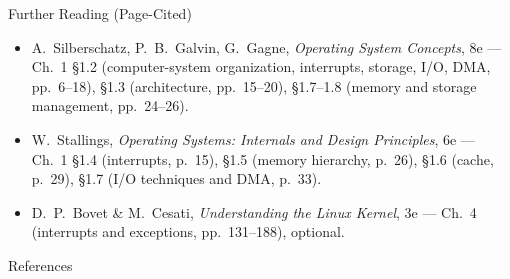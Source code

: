 \documentclass[aspectratio=169]{beamer}
\begin{document}
\begin{frame}{Further Reading (Page-Cited)}
  \footnotesize
  \begin{itemize}
    \item A.~Silberschatz, P.~B.~Galvin, G.~Gagne, \emph{Operating System
      Concepts}, 8e --- Ch.~1 \S1.2 (computer-system organization, interrupts,
      storage, I/O, DMA, pp.~6--18), \S1.3 (architecture, pp.~15--20),
      \S1.7--1.8 (memory and storage management, pp.~24--26).
    \item W.~Stallings, \emph{Operating Systems: Internals and Design
      Principles}, 6e --- Ch.~1 \S1.4 (interrupts, p.~15), \S1.5 (memory
      hierarchy, p.~26), \S1.6 (cache, p.~29), \S1.7 (I/O techniques and DMA,
      p.~33).
    \item D.~P.~Bovet \& M.~Cesati, \emph{Understanding the Linux Kernel},
      3e --- Ch.~4 (interrupts and exceptions, pp.~131--188), optional.
  \end{itemize}
  \vspace{0.2cm}
\end{frame}

\begin{frame}[allowframebreaks]{References}
  \footnotesize
  
  
\end{frame}
\end{document}
